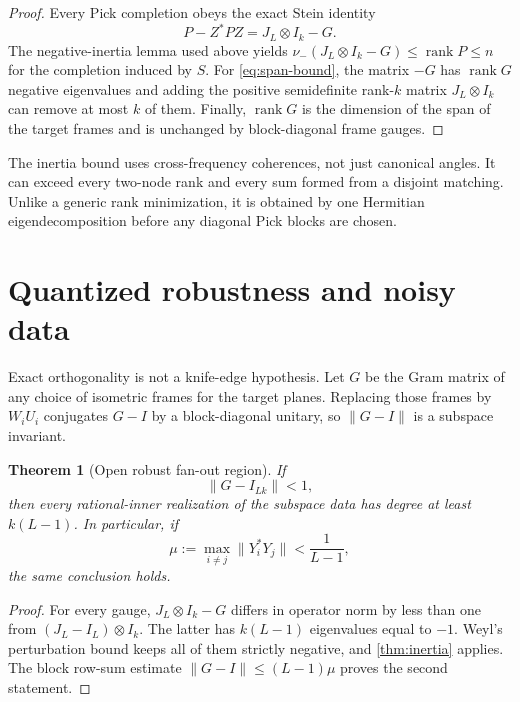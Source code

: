 \documentclass[11pt]{article}
\newtheorem{theorem}{Theorem}[section]
\theoremstyle{definition}
\theoremstyle{remark}
\newcommand{\rank}{\operatorname{rank}}
\newcommand{\nminus}{\nu_{-}}
\newcommand{\norm}[1]{\lVert#1\rVert}
\begin{document}
\begin{proof}
Every Pick completion obeys the exact Stein identity
\begin{equation}\label{eq:general-stein}
                 P-Z^*PZ=J_L\otimes I_k-G.
\end{equation}
The negative-inertia lemma used above yields
$\nminus(J_L\otimes I_k-G)\le\rank P\le n$ for the completion induced by
$S$.  For \eqref{eq:span-bound}, the matrix $-G$ has $\rank G$ negative
eigenvalues and adding the positive semidefinite rank-$k$ matrix
$J_L\otimes I_k$ can remove at most $k$ of them.  Finally,
$\rank G$ is the dimension of the span of the target frames and is unchanged
by block-diagonal frame gauges.
\end{proof}

The inertia bound uses cross-frequency coherences, not just canonical angles.
It can exceed every two-node rank and every sum formed from a disjoint
matching.  Unlike a generic rank minimization, it is obtained by one Hermitian
eigendecomposition before any diagonal Pick blocks are chosen.

\section{Quantized robustness and noisy data}

Exact orthogonality is not a knife-edge hypothesis.  Let $G$ be the Gram
matrix of any choice of isometric frames for the target planes.  Replacing
those frames by $W_iU_i$ conjugates $G-I$ by a block-diagonal unitary, so
$\norm{G-I}$ is a subspace invariant.

\begin{theorem}[Open robust fan-out region]
\label{thm:robust}
If
\begin{equation}\label{eq:robust-condition}
                             \norm{G-I_{Lk}}<1,
\end{equation}
then every rational-inner realization of the subspace data has degree at
least $k(L-1)$.  In particular, if
\begin{equation}\label{eq:coherence-condition}
 \mu:=\max_{i\ne j}\norm{Y_i^*Y_j}<\frac{1}{L-1},
\end{equation}
the same conclusion holds.
\end{theorem}

\begin{proof}
For every gauge, $J_L\otimes I_k-G$ differs in operator norm by less than one
from $(J_L-I_L)\otimes I_k$.  The latter has $k(L-1)$ eigenvalues equal to
$-1$.  Weyl's perturbation bound keeps all of them strictly negative, and
\cref{thm:inertia} applies.  The block row-sum estimate
$\norm{G-I}\le(L-1)\mu$ proves the second statement.
\end{proof}
\end{document}
